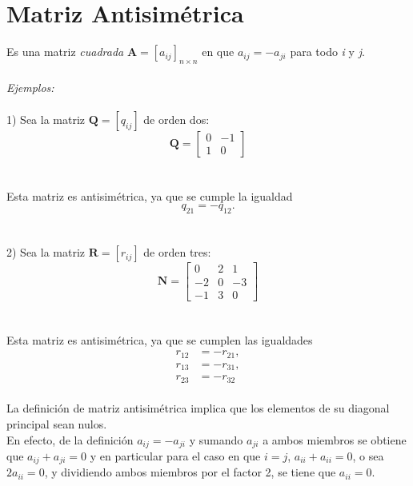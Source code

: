 \documentclass[a4paper,12pt]{report} %
\begin{document}
\section{Matriz Antisimétrica}
Es una matriz \textit{cuadrada} \(\mathbf{A} = \left[\mathit{a_{ij}}\right]_\mathit{n\times n}\) en que \(\mathit{a_{ij}} = \mathit{-a_{ji}}\) para todo \textit{i} y \textit{j}.
\\ \\
\textit{Ejemplos:} \\ \\
1) Sea la matriz \(\mathbf{Q} = \left[\mathit{q_{ij}}\right]\) de orden dos:
\[
\mathbf{Q} = \begin{bmatrix}
    0 & -1\\
    1 & 0
\end{bmatrix}
\]\\ \\
Esta matriz es antisimétrica, ya que se cumple la igualdad 
\[\mathit{q_{21}} = \mathit{-q_{12}}.\] \\ \\
2) Sea la matriz \(\mathbf{R} = \left[\mathit{r_{ij}}\right]\) de orden tres:
\[
\mathbf{N} = \begin{bmatrix}
    0 & 2 & 1\\
    -2 & 0 & -3\\
    -1 & 3 & 0
\end{bmatrix}
\]\\ \\
Esta matriz es antisimétrica, ya que se cumplen las igualdades
\[
\begin{matrix}
\mathit{r_{12}} &= \mathit{-r_{21}},\\
\mathit{r_{13}} & = \mathit{-r_{31}},\\
\mathit{r_{23}} & = \mathit{-r_{32}}
\end{matrix}
\]
\\
La definición de matriz antisimétrica implica que los elementos de su diagonal principal sean nulos.\\
En efecto, de la definición \(\mathit{a_{ij}} = \mathit{-a_{ji}}\) y sumando \(a_{ji}\) a ambos miembros se obtiene que \(\mathit{a_{ij} + a_{ji}} = 0\) y en particular para el caso en que \(\mathit{i=j}\), \(\mathit{a_{ii} + a_{ii}} = 0\), o sea \(2\mathit{a_{ii}} = 0\), y dividiendo ambos miembros por el factor 2, se tiene que \(\mathit{a_{ii}} = 0\).
\\
\end{document}
